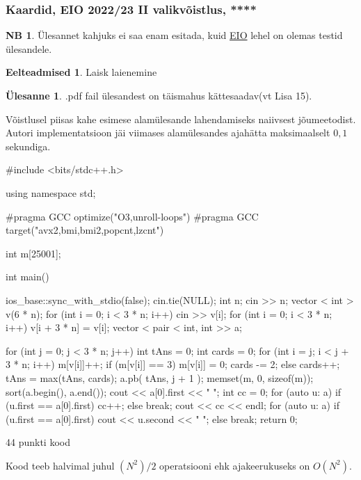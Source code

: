 \documentclass{trkut}
\theoremstyle{definition}
\newtheorem*{prereq}{Eelteadmised}
\newtheorem*{extra}{NB}
\newtheorem*{Text}{Ülesanne}
\begin{document}
\subsubsection{Kaardid, EIO 2022/23 II valikvõistlus, ****}
\begin{extra}
Ülesannet kahjuks ei saa enam esitada, kuid \href{eio.ee}{EIO} lehel on olemas testid ülesandele.
\end{extra}
\begin{prereq}
Laisk laienemine
\end{prereq}
\begin{Text}
.pdf fail ülesandest on täismahus kättesaadav(vt Lisa 15). \parencite{10}
\end{Text}

Võistlusel piisas kahe esimese alamülesande lahendamiseks naiivsest jõumeetodist.
Autori implementatsioon jäi viimases alamülesandes ajahätta maksimaalselt $0,1$ sekundiga.
 \begin{cclol}
#include <bits/stdc++.h>

using namespace std;

#pragma GCC optimize("O3,unroll-loops")
#pragma GCC target("avx2,bmi,bmi2,popcnt,lzcnt")

int m[25001];

int main() {
  ios_base::sync_with_stdio(false);
  cin.tie(NULL);
  int n;
  cin >> n;
  vector < int > v(6 * n);
  for (int i = 0; i < 3 * n; i++) {
    cin >> v[i];
  }
  for (int i = 0; i < 3 * n; i++) {
    v[i + 3 * n] = v[i];
  }
  vector < pair < int, int >> a;

  for (int j = 0; j < 3 * n; j++) {
    int tAns = 0;
    int cards = 0;
    for (int i = j; i < j + 3 * n; i++) {
      m[v[i]]++;
      if (m[v[i]] == 3) {
        m[v[i]] = 0;
        cards -= 2;
      } else {
        cards++;
      }
      tAns = max(tAns, cards);
    }
    a.pb({
      tAns,
      j + 1
    });
    memset(m, 0, sizeof(m));
  }
  sort(a.begin(), a.end());
  cout << a[0].first << " ";
  int cc = 0;
  for (auto u: a) {
    if (u.first == a[0].first) cc++;
    else break;
  }
  cout << cc << endl;
  for (auto u: a) {
    if (u.first == a[0].first) cout << u.second << " ";
    else break;
  }
  return 0;
}
    \end{cclol}
    \begin{kk}[H]
    \caption{44 punkti kood}%
    \end{kk}

Kood teeb halvimal juhul $(N^2)/2$ operatsiooni ehk ajakeerukuseks on $O(N^2)$.
\end{document}

